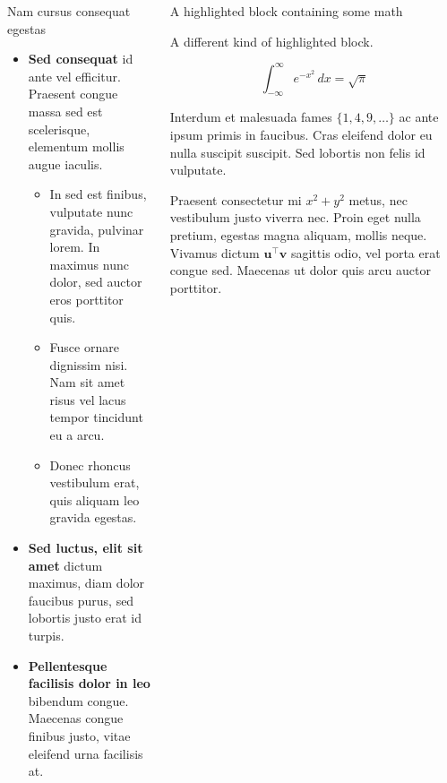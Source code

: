 \begin{frame}[t]
\begin{columns}[t]
\begin{column}{\colwidth}
\begin{block}{Nam cursus consequat egestas}
    \begin{itemize}
      \item \textbf{Sed consequat} id ante vel efficitur. Praesent congue massa
        sed est scelerisque, elementum mollis augue iaculis.
        \begin{itemize}
          \item In sed est finibus, vulputate
            nunc gravida, pulvinar lorem. In maximus nunc dolor, sed auctor eros
            porttitor quis.
          \item Fusce ornare dignissim nisi. Nam sit amet risus vel lacus
            tempor tincidunt eu a arcu.
          \item Donec rhoncus vestibulum erat, quis aliquam leo
            gravida egestas.
        \end{itemize}
      \item \textbf{Sed luctus, elit sit amet} dictum maximus, diam dolor
        faucibus purus, sed lobortis justo erat id turpis.
      \item \textbf{Pellentesque facilisis dolor in leo} bibendum congue.
        Maecenas congue finibus justo, vitae eleifend urna facilisis at.
    \end{itemize}

  \end{block}

\end{column}

\separatorcolumn

\begin{column}{\colwidth}

  \begin{exampleblock}{A highlighted block containing some math}

    A different kind of highlighted block.

    $$
    \int_{-\infty}^{\infty} e^{-x^2}\,dx = \sqrt{\pi}
    $$

    Interdum et malesuada fames $\{1, 4, 9, \ldots\}$ ac ante ipsum primis in
    faucibus. Cras eleifend dolor eu nulla suscipit suscipit. Sed lobortis non
    felis id vulputate.


    Praesent consectetur mi $x^2 + y^2$ metus, nec vestibulum justo viverra
    nec. Proin eget nulla pretium, egestas magna aliquam, mollis neque. Vivamus
    dictum $\mathbf{u}^\intercal\mathbf{v}$ sagittis odio, vel porta erat
    congue sed. Maecenas ut dolor quis arcu auctor porttitor.


\end{exampleblock}
\end{column}
\end{columns}
\end{frame}
